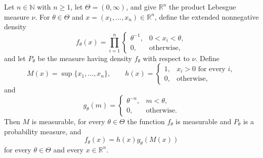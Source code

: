 \begin{theorem}
Let $n\in\mathbb N$ with $n\ge 1$, let
$\Theta=(0,\infty)$, and give $\mathbb R^n$ the product Lebesgue measure
$\nu$.  For $\theta\in\Theta$ and $x=(x_1,\ldots,x_n)\in\mathbb R^n$,
define the extended nonnegative density
\[
  f_\theta(x)=\prod_{i=1}^n
  \begin{cases}
    \theta^{-1},&0<x_i<\theta,\\
    0,&\text{otherwise},
  \end{cases}
\]
and let $P_\theta$ be the measure having density $f_\theta$ with respect to
$\nu$.  Define
\[
  M(x)=\sup\{x_1,\ldots,x_n\},\qquad
  h(x)=\begin{cases}1,&x_i>0\text{ for every }i,\\0,&\text{otherwise},\end{cases}
\]
and
\[
  g_\theta(m)=\begin{cases}\theta^{-n},&m<\theta,\\0,&\text{otherwise}.\end{cases}
\]
Then $M$ is measurable, for every $\theta\in\Theta$ the function
$f_\theta$ is measurable and $P_\theta$ is a probability measure, and
\[
  f_\theta(x)=h(x)g_\theta(M(x))
\]
for every $\theta\in\Theta$ and every $x\in\mathbb R^n$.
\end{theorem}
